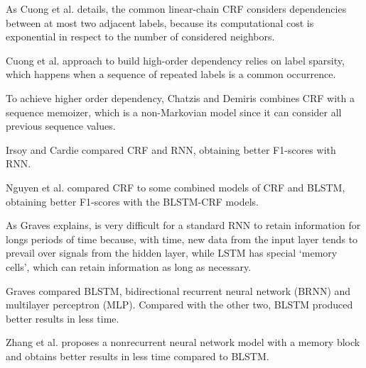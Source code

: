 \begin{enumerate}[itemindent=\parindent,label=\textbf{RQ\arabic*.}]
    
    
    As Cuong et al. \cite{Cuong:2014:CRF:2627435.2638567} details, the common linear-chain CRF considers dependencies between at most two adjacent labels, because its computational cost is exponential in respect to the number of considered neighbors.
    
    Cuong et al. \cite{Cuong:2014:CRF:2627435.2638567} approach to build high-order dependency relies on label sparsity, which happens when a sequence of repeated labels is a common occurrence.
    
    To achieve higher order dependency, Chatzis and Demiris \cite{Chatzis20131523} combines CRF with a sequence memoizer, which is a non-Markovian model since it can consider all previous sequence values.
    
    
    
    
    Irsoy and Cardie \cite{Irsoy2014720} compared CRF and RNN, obtaining better F1-scores with RNN.
    
    Nguyen et al. \cite{nguyen2018recurrent} compared CRF to some combined models of CRF and BLSTM, obtaining better F1-scores with the BLSTM-CRF models.

    
    As Graves \cite{gravessupervised} explains, is very difficult for a standard RNN to retain information for longs periods of time because, with time, new data from the input layer tends to prevail over signals from the hidden layer, while LSTM has special `memory cells', which can retain information as long as necessary.
    
    Graves \cite{gravessupervised} compared BLSTM, bidirectional recurrent neural network (BRNN) and multilayer perceptron (MLP). Compared with the other two, BLSTM produced better results in less time.
    
    Zhang et al. \cite{Zhang:2017:NNS:3105654.3105669} 
    proposes a nonrecurrent neural network model with a memory block and obtains better results in less time compared to BLSTM.


\end{enumerate}
